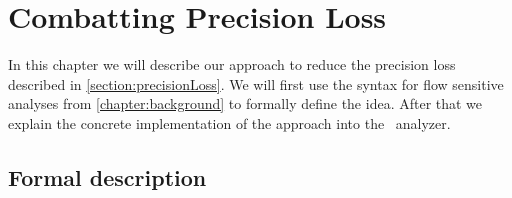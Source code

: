 

\chapter{Combatting Precision Loss}\label{chapter:mainContributions}
  In this chapter we will describe our approach to reduce the precision loss described in \autoref{section:precisionLoss}. We will first use the syntax for flow sensitive analyses from \autoref{chapter:background} to formally define the idea. After that we explain the concrete implementation of the approach into the \gob\ analyzer.
  \section{Formal description}
